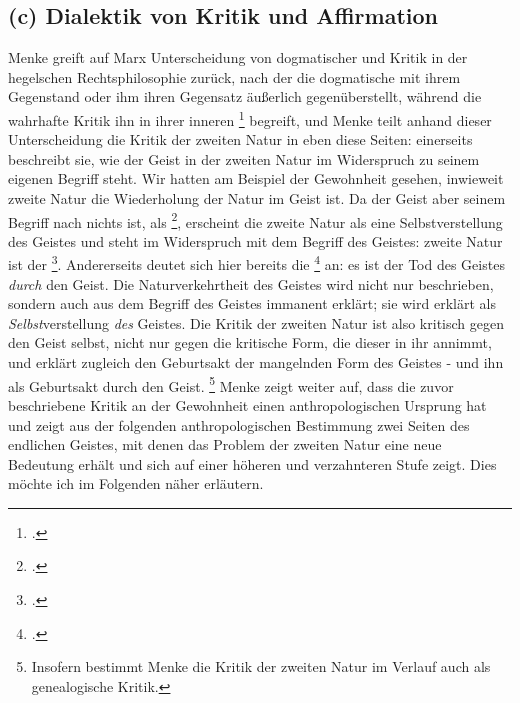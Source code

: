 \documentclass[12pt, a4paper, openany]{report}
\begin{document}
\subsection{(c) Dialektik von Kritik und Affirmation}\label{kritik_affirmation}
Menke greift auf Marx Unterscheidung von dogmatischer und  Kritik in der hegelschen Rechtsphilosophie zurück, nach der die dogmatische mit ihrem Gegenstand  oder ihm ihren Gegensatz äußerlich gegenüberstellt, während die wahrhafte Kritik ihn in ihrer inneren \footcite[][296]{marx_kritik_1977} begreift, und Menke teilt anhand dieser Unterscheidung die Kritik der zweiten Natur in eben diese Seiten:
einerseits beschreibt sie, wie der Geist in der zweiten Natur im Widerspruch zu seinem eigenen Begriff steht.
Wir hatten am Beispiel der Gewohnheit gesehen, inwieweit zweite Natur die Wiederholung der Natur im Geist ist. 
Da der Geist aber seinem Begriff nach nichts ist, als \footcite[][137]{menke_autonomie_2018}, erscheint die zweite Natur als eine Selbstverstellung des Geistes und steht im Widerspruch mit dem Begriff des Geistes:
zweite Natur ist der \footcite[][43]{menke_autonomie_2018}.
Andererseits deutet sich hier bereits die \footcite[][296]{marx_kritik_1977} an:
es ist der Tod des Geistes \emph{durch} den Geist.
Die Naturverkehrtheit des Geistes wird nicht nur beschrieben, sondern auch aus dem Begriff des Geistes immanent erklärt;
sie wird erklärt als \emph{Selbst}verstellung \emph{des} Geistes. 
Die Kritik der zweiten Natur ist also kritisch gegen den Geist selbst, nicht nur gegen die kritische Form, die dieser in ihr annimmt, und erklärt zugleich den Geburtsakt der mangelnden Form des Geistes - und ihn als Geburtsakt durch den Geist.%
\footnote{
    Insofern bestimmt Menke die Kritik der zweiten Natur im Verlauf auch als genealogische Kritik.
}
Menke zeigt weiter auf, dass die zuvor beschriebene Kritik an der Gewohnheit einen anthropologischen Ursprung hat und zeigt aus der folgenden anthropologischen Bestimmung zwei Seiten des endlichen Geistes, mit denen das Problem der zweiten Natur eine neue Bedeutung erhält und sich auf einer höheren und verzahnteren Stufe zeigt. 
Dies möchte ich im Folgenden näher erläutern.\\
\end{document}
